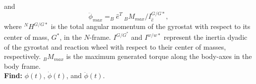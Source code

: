 \documentclass[letterpaper, preprint, paper,11pt]{AAS}	%
\begin{document}

			and
			\begin{equation}\label{phiddotmax}
				\ddot{\phi}_{max}=_B\hat{e}^T\  _BM_{max}/I_{\hat{e}}^{G/G*},
			\end{equation}
			where $^NH^{G/G*}$ is the total angular momentum of the gyrostat with respect to its center of mass, $G^*$, in the $N$-frame. $I^{G/G^*}$ and $I^{w/w*}$ represent the inertia dyadic of the gyrostat and reaction wheel with respect to their center of masses, respectively. $_BM_{max}$ is the maximum generated torque along the body-axes in the body frame. \\
			
			{\bf Find:} $\phi(t)$, $\dot{\phi}(t)$, and $\ddot{\phi}(t)$.

			
\end{document}

